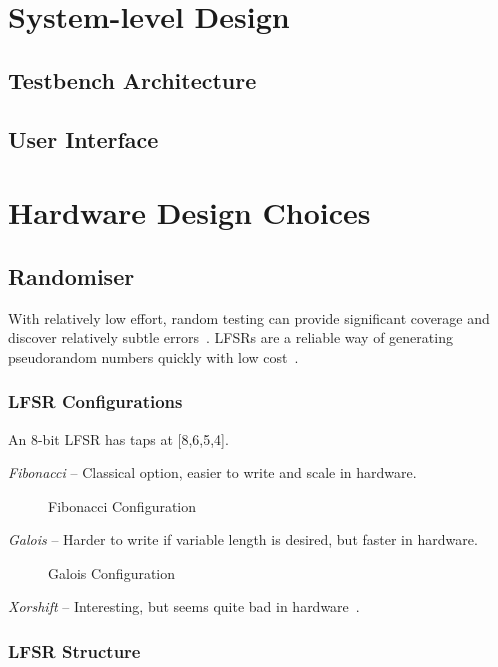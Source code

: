 \section{System-level Design}

\subsection{Testbench Architecture}
\subsection{User Interface}

\section{Hardware Design Choices}


\subsection{Randomiser}
With relatively low effort, random testing can provide significant coverage and discover relatively subtle errors~\cite{Duran1}.
LFSRs are a reliable way of generating pseudorandom numbers quickly with low cost~\cite{Hazwani1}.
\subsubsection{LFSR Configurations}

An 8-bit LFSR has taps at [8,6,5,4].

\textit{Fibonacci} --
Classical option, easier to write and scale in hardware.

\begin{figure}[ht]
  \centering
  
  \caption{Fibonacci Configuration}
  \label{FibLFSR}
\end{figure}

\textit{Galois} --
Harder to write if variable length is desired, but faster in hardware.

\begin{figure}[ht]
  \centering
  
  \caption{Galois Configuration}
  \label{GalLFSR}
\end{figure}

\textit{Xorshift} --
Interesting, but seems quite bad in hardware~\cite{Marsaglia1}.

\subsubsection{LFSR Structure}

